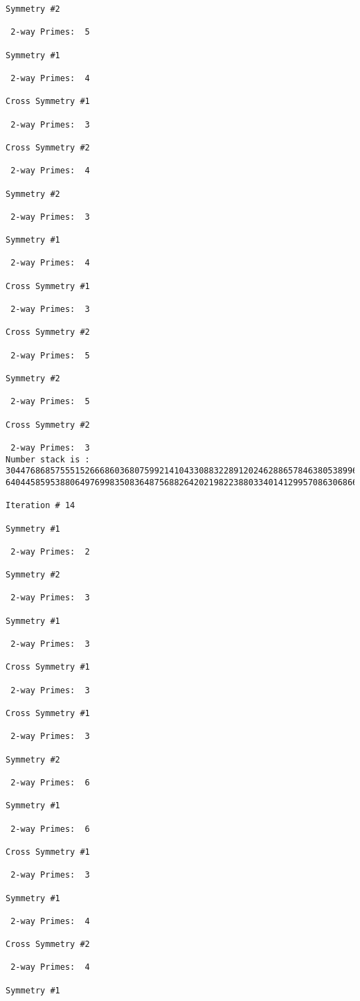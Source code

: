 \begin{verbatim}
Symmetry #2

 2-way Primes: 	5

Symmetry #1

 2-way Primes: 	4

Cross Symmetry #1

 2-way Primes: 	3

Cross Symmetry #2

 2-way Primes: 	4

Symmetry #2

 2-way Primes: 	3

Symmetry #1

 2-way Primes: 	4

Cross Symmetry #1

 2-way Primes: 	3

Cross Symmetry #2

 2-way Primes: 	5

Symmetry #2

 2-way Primes: 	5

Cross Symmetry #2

 2-way Primes: 	3
Number stack is :
30447686857555152666860368075992141043308832289120246288657846380538996794608835958544046240163340857
64044585953880649769983508364875688264202198223880334014129957086306866625155575868674403758043361042

Iteration #	14

Symmetry #1

 2-way Primes: 	2

Symmetry #2

 2-way Primes: 	3

Symmetry #1

 2-way Primes: 	3

Cross Symmetry #1

 2-way Primes: 	3

Cross Symmetry #1

 2-way Primes: 	3

Symmetry #2

 2-way Primes: 	6

Symmetry #1

 2-way Primes: 	6

Cross Symmetry #1

 2-way Primes: 	3

Symmetry #1

 2-way Primes: 	4

Cross Symmetry #2

 2-way Primes: 	4

Symmetry #1


\end{verbatim}
